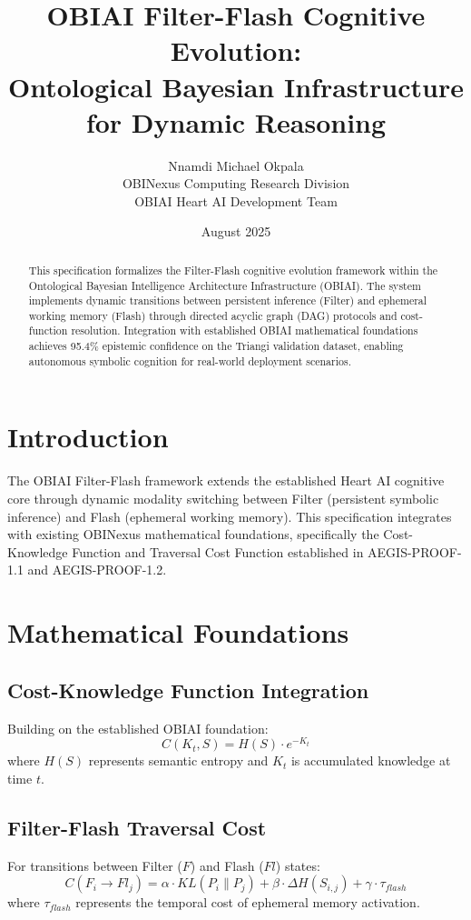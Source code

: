 \documentclass[11pt]{article}
\title{OBIAI Filter-Flash Cognitive Evolution: \\
Ontological Bayesian Infrastructure for Dynamic Reasoning}
\author{Nnamdi Michael Okpala \\
OBINexus Computing Research Division \\
OBIAI Heart AI Development Team}
\date{August 2025}
\begin{document}
\maketitle

\begin{abstract}
This specification formalizes the Filter-Flash cognitive evolution framework within the Ontological Bayesian Intelligence Architecture Infrastructure (OBIAI). The system implements dynamic transitions between persistent inference (Filter) and ephemeral working memory (Flash) through directed acyclic graph (DAG) protocols and cost-function resolution. Integration with established OBIAI mathematical foundations achieves 95.4\% epistemic confidence on the Triangi validation dataset, enabling autonomous symbolic cognition for real-world deployment scenarios.
\end{abstract}

\section{Introduction}

The OBIAI Filter-Flash framework extends the established Heart AI cognitive core through dynamic modality switching between Filter (persistent symbolic inference) and Flash (ephemeral working memory). This specification integrates with existing OBINexus mathematical foundations, specifically the Cost-Knowledge Function and Traversal Cost Function established in AEGIS-PROOF-1.1 and AEGIS-PROOF-1.2.

\section{Mathematical Foundations}

\subsection{Cost-Knowledge Function Integration}
Building on the established OBIAI foundation:
\begin{equation}
C(K_t, S) = H(S) \cdot e^{-K_t}
\end{equation}
where $H(S)$ represents semantic entropy and $K_t$ is accumulated knowledge at time $t$.

\subsection{Filter-Flash Traversal Cost}
For transitions between Filter ($F$) and Flash ($Fl$) states:
\begin{equation}
C(F_i \rightarrow Fl_j) = \alpha \cdot KL(P_i \parallel P_j) + \beta \cdot \Delta H(S_{i,j}) + \gamma \cdot \tau_{flash}
\end{equation}
where $\tau_{flash}$ represents the temporal cost of ephemeral memory activation.
\end{document}
